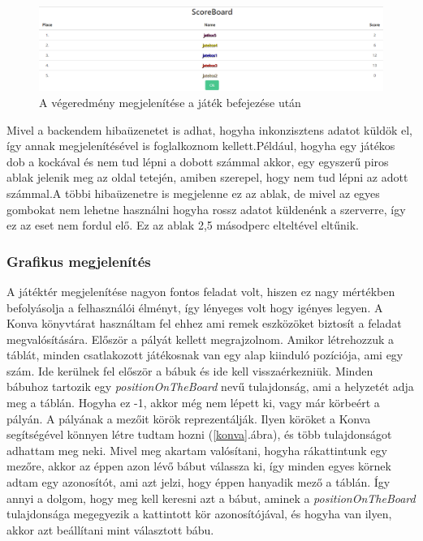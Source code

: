 \documentclass[a4paper,twoside]{article}
\begin{document}
\begin{figure}
	\caption{A végeredmény megjelenítése a játék befejezése után}
	\label{game-end}
	\centering
	\includegraphics[scale=0.32]{game-end}
\end{figure}
\FloatBarrier
Mivel a backendem hibaüzenetet is adhat, hogyha inkonzisztens adatot küldök el, így annak
megjelenítésével is foglalkoznom kellett.Például, hogyha egy játékos dob a kockával és nem tud lépni a dobott számmal akkor, egy egyszerű piros ablak
jelenik meg az oldal tetején, amiben szerepel, hogy nem tud lépni az adott számmal.A többi hibaüzenetre is megjelenne ez az ablak, de mivel az egyes gombokat nem lehetne használni hogyha rossz adatot küldenénk a szerverre, így ez az eset nem fordul elő. Ez az ablak 2,5 másodperc elteltével eltűnik.
\subsubsection{Grafikus megjelenítés}

A játéktér megjelenítése nagyon fontos feladat volt, hiszen ez nagy mértékben befolyásolja a felhasználói élményt, így lényeges volt hogy igényes legyen. A Konva könyvtárat használtam fel ehhez ami remek eszközöket biztosít a feladat megvalósítására. 
Először a pályát kellett megrajzolnom. Amikor létrehozzuk a táblát, minden csatlakozott játékosnak van egy alap kiinduló pozíciója, ami egy szám. Ide kerülnek fel először a bábuk és ide kell visszaérkezniük. Minden bábuhoz tartozik egy \textit{positionOnTheBoard} nevű tulajdonság, ami a helyzetét adja meg a táblán. Hogyha ez -1, akkor még nem lépett ki, vagy már körbeért a pályán. A pályának a mezőit körök reprezentálják. Ilyen köröket a Konva segítségével könnyen létre tudtam hozni (\ref{konva}.ábra), és több tulajdonságot adhattam meg neki. Mivel meg akartam valósítani, hogyha rákattintunk egy mezőre, akkor az éppen azon lévő bábut válassza ki, így minden egyes körnek adtam egy azonosítót, ami azt jelzi, hogy éppen hanyadik mező a táblán. Így annyi a dolgom, hogy meg kell keresni azt a bábut, aminek a \textit{positionOnTheBoard} tulajdonsága megegyezik a kattintott kör azonosítójával, és hogyha van ilyen, akkor azt beállítani mint választott bábu.
\end{document}
